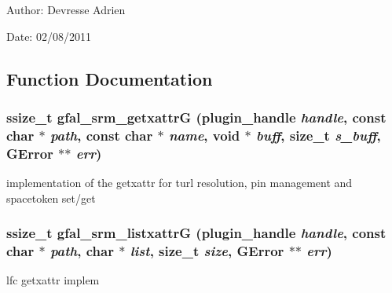 \begin{Desc}
\item[Author:]Devresse Adrien \end{Desc}
\begin{Desc}
\item[Date:]02/08/2011 \end{Desc}


\subsection{Function Documentation}
\subsubsection{\setlength{\rightskip}{0pt plus 5cm}ssize\_\-t gfal\_\-srm\_\-getxattr\-G (plugin\_\-handle {\em handle}, const char $\ast$ {\em path}, const char $\ast$ {\em name}, void $\ast$ {\em buff}, size\_\-t {\em s\_\-buff}, GError $\ast$$\ast$ {\em err})}\label{gfal__common__srm__getxattr_8c_965d1353923dbcca04d0feb99449bb47}


implementation of the getxattr for turl resolution, pin management and spacetoken set/get 
\subsubsection{\setlength{\rightskip}{0pt plus 5cm}ssize\_\-t gfal\_\-srm\_\-listxattr\-G (plugin\_\-handle {\em handle}, const char $\ast$ {\em path}, char $\ast$ {\em list}, size\_\-t {\em size}, GError $\ast$$\ast$ {\em err})}\label{gfal__common__srm__getxattr_8c_522aab74f06436ef8ac83dc1dc1fc9e1}


lfc getxattr implem 